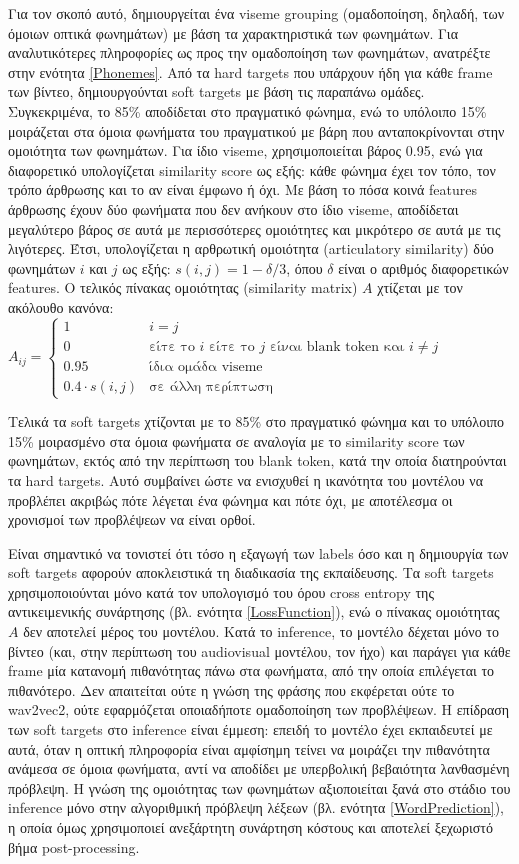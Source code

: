 Για τον σκοπό αυτό, δημιουργείται ένα viseme grouping (ομαδοποίηση, δηλαδή, των όμοιων οπτικά φωνημάτων) με βάση τα χαρακτηριστικά των φωνημάτων. Για αναλυτικότερες πληροφορίες ως προς την ομαδοποίηση των φωνημάτων, ανατρέξτε στην ενότητα \ref{Phonemes}. Από τα hard targets που υπάρχουν ήδη για κάθε frame των βίντεο, δημιουργούνται soft targets με βάση τις παραπάνω ομάδες. Συγκεκριμένα, το 85\% αποδίδεται στο πραγματικό φώνημα, ενώ το υπόλοιπο 15\% μοιράζεται στα όμοια φωνήματα του πραγματικού με βάρη που ανταποκρίνονται στην ομοιότητα των φωνημάτων. Για ίδιο viseme, χρησιμοποιείται βάρος 0.95, ενώ για διαφορετικό υπολογίζεται similarity score ως εξής: κάθε φώνημα έχει τον τόπο, τον τρόπο άρθρωσης και το αν είναι έμφωνο ή όχι. Με βάση το πόσα κοινά features άρθρωσης έχουν δύο φωνήματα που δεν ανήκουν στο ίδιο viseme, αποδίδεται μεγαλύτερο βάρος σε αυτά με περισσότερες ομοιότητες και μικρότερο σε αυτά με τις λιγότερες. Έτσι, υπολογίζεται η αρθρωτική ομοιότητα (articulatory similarity) δύο φωνημάτων $i$ και $j$ ως εξής: $s(i,j) = 1 - \delta / 3$, όπου $\delta$ είναι ο αριθμός διαφορετικών features. Ο τελικός πίνακας ομοιότητας (similarity matrix) $A$ χτίζεται με τον ακόλουθο κανόνα:
$A_{ij} = \begin{cases}
1 & i = j \\
0 & \text{είτε το }i \text{ είτε το }j \text{ είναι blank token και } i \neq j\\
0.95 & \text{ίδια ομάδα viseme} \\
0.4 \cdot s(i,j) & \text{σε άλλη περίπτωση} 
\end{cases}
$

Τελικά τα soft targets χτίζονται με το 85\% στο πραγματικό φώνημα και το υπόλοιπο 15\% μοιρασμένο στα όμοια φωνήματα σε αναλογία με το similarity score των φωνημάτων, εκτός από την περίπτωση του blank token, κατά την οποία διατηρούνται τα hard targets. Αυτό συμβαίνει ώστε να ενισχυθεί η ικανότητα του μοντέλου να προβλέπει ακριβώς πότε λέγεται ένα φώνημα και πότε όχι, με αποτέλεσμα οι χρονισμοί των προβλέψεων να είναι ορθοί.

Είναι σημαντικό να τονιστεί ότι τόσο η εξαγωγή των labels όσο και η δημιουργία των soft targets αφορούν αποκλειστικά τη διαδικασία της εκπαίδευσης. Τα soft targets χρησιμοποιούνται μόνο κατά τον υπολογισμό του όρου cross entropy της αντικειμενικής συνάρτησης (βλ. ενότητα \ref{LossFunction}), ενώ ο πίνακας ομοιότητας $A$ δεν αποτελεί μέρος του μοντέλου. Κατά το inference, το μοντέλο δέχεται μόνο το βίντεο (και, στην περίπτωση του audiovisual μοντέλου, τον ήχο) και παράγει για κάθε frame μία κατανομή πιθανότητας πάνω στα φωνήματα, από την οποία επιλέγεται το πιθανότερο. Δεν απαιτείται ούτε η γνώση της φράσης που εκφέρεται ούτε το wav2vec2, ούτε εφαρμόζεται οποιαδήποτε ομαδοποίηση των προβλέψεων. Η επίδραση των soft targets στο inference είναι έμμεση: επειδή το μοντέλο έχει εκπαιδευτεί με αυτά, όταν η οπτική πληροφορία είναι αμφίσημη τείνει να μοιράζει την πιθανότητα ανάμεσα σε όμοια φωνήματα, αντί να αποδίδει με υπερβολική βεβαιότητα λανθασμένη πρόβλεψη. Η γνώση της ομοιότητας των φωνημάτων αξιοποιείται ξανά στο στάδιο του inference μόνο στην αλγοριθμική πρόβλεψη λέξεων (βλ. ενότητα \ref{WordPrediction}), η οποία όμως χρησιμοποιεί ανεξάρτητη συνάρτηση κόστους και αποτελεί ξεχωριστό βήμα post-processing.

